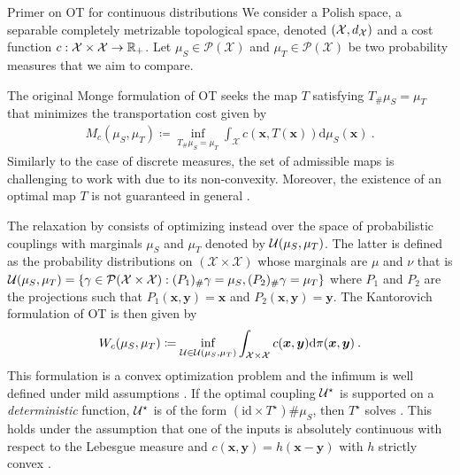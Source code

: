 \begin{mem1}{Primer on OT for continuous distributions}\label{mem:ot_continuous}
    We consider a Polish space, \ie a separable completely metrizable topological space, denoted $(\mathcal{X}, d_{{\mathcal{X}}})$ and a cost function $c : \mathcal{X} \times \mathcal{X} \to \mathbb{R}_+$. Let $\mu_S \in \mathcal{P}(\mathcal{X})$ and $\mu_T \in \mathcal{P}(\mathcal{X})$ be two probability measures that we aim to compare.

    The original Monge formulation \citep{monge1781memoire} of OT seeks the map $T$ satisfying $T_{\#}\mu_S = \mu_T$ that minimizes the transportation cost given by
    \begin{align}\label{eq:monge_pb_continuous}
        M_c(\mu_S, \mu_T) \coloneqq \inf_{T_{\#}\mu_S = \mu_T} \int_{\mathcal{X}} c(\bm{x}, T(\bm{x})) \mathrm{d}\mu_S(\bm{x}) \:.
    \end{align}
    Similarly to the case of discrete measures, the set of admissible maps is challenging to work with due to its non-convexity. Moreover, the existence of an optimal map \(T\) is not guaranteed in general \citep{santambrogio2015optimal}.

    The relaxation by \cite{kantorovich1942translocation} consists of optimizing instead over the space of probabilistic couplings with marginals $\mu_S$ and $\mu_T$ denoted by ${\mathcal{U}}(\mu_S, \mu_T)$. The latter is defined as the probability distributions on $(\mathcal{X} \times \mathcal{X})$ whose marginals are $\mu$ and $\nu$ that is ${\mathcal{U}}(\mu_S, \mu_T) = \left\{ \gamma \in \mathcal{P}(\mathcal{X} \times \mathcal{X}) : (P_{1})_\# \gamma = \mu_S, (P_{2})_\# \gamma = \mu_T \right\}$ where $P_{1}$ and $P_{2}$ are the projections such that $P_{1}(\bm{x}, \bm{y}) = \bm{x}$ and $P_{2}(\bm{x}, \bm{y}) = \bm{y}$.
    The Kantorovich formulation of OT is then given by
    \begin{align}\label{eq:Wasserstein}
        W_c(\mu_S, \mu_T) \coloneqq \inf_{{\mathcal{U}} \in {\mathcal{U}}(\mu_S, \mu_T)} \int_{\mathcal{X} \times \mathcal{X}} c(\bm{x}, \bm{y}) \mathrm{d}\pi(\bm{x}, \bm{y}) \:.
    \end{align}
    This formulation is a convex optimization problem and the infimum is well
    defined under mild assumptions \citep{santambrogio2015optimal}. If the optimal
    coupling ${\mathcal{U}}^\star$ is supported on a \emph{deterministic} function, \ie
    ${\mathcal{U}}^\star$ is of the form $(\mathrm{id} \times T^\star)\# \mu_S$, then
    $T^\star$ solves . This holds under the assumption that one
    of the inputs is absolutely continuous with respect to the Lebesgue measure
    and $c(\bm{x}, \bm{y}) = h(\bm{x} - \bm{y})$ with
    $h$ strictly convex \citep{gangbo1996geometry}.
    
    \end{mem1}

